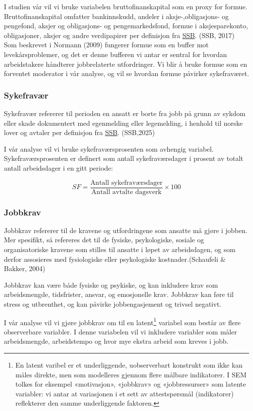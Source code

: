 \documentclass[
  12pt,
  a4paper,
  DIV=11,
  numbers=noendperiod]{scrartcl}
\begin{document}
I studien vår vil vi bruke variabelen bruttofinanskapital som en proxy
for formue. Bruttofinanskapital omfatter bankinnskudd, andeler i
aksje-,obligasjons- og pengefond, aksjer og obligasjons- og
pengemarkedsfond, formue i aksjesparekonto, obligasjoner, aksjer og
andre verdipapirer per definisjon fra
\href{https://www.ssb.no/a/metadata/conceptvariable/vardok/3449/nb}{SSB}.
(SSB, 2017) Som beskrevet i Normann (2009) fungerer formue som en buffer
mot levekårsproblemer, og det er denne bufferen vi antar er sentral for
hvordan arbeidstakere håndterer jobbrelaterte utfordringer. Vi blir å
bruke formue som en forventet moderator i vår analyse, og vil se hvordan
formue påvirker sykefraværet.

\subsubsection{Sykefravær}\label{sykefravuxe6r}

Sykefravær refererer til perioden en ansatt er borte fra jobb på grunn
av sykdom eller skade dokumentert med egenmelding eller legemelding, i
henhold til norske lover og avtaler per definisjon fra
\href{https://www.ssb.no/arbeid-og-lonn/arbeidsmiljo-sykefravaer-og-arbeidskonflikter/statistikk/sykefravaer}{SSB}.
(SSB,2025)

I vår analyse vil vi bruke sykefraværsprosenten som avhengig variabel.
Sykefraværsprosenten er definert som antall sykefraværsdager i prosent
av totalt antall arbeidsdager i en gitt periode:

\[
SF = \frac{ \text{Antall sykefraværsdager}}{\text{Antall avtalte dagsverk}}  \times 100
\]

\subsubsection{Jobbkrav}\label{jobbkrav}

Jobbkrav refererer til de kravene og utfordringene som ansatte må gjøre
i jobben. Mer spesifikt, så refereres det til de fysiske, psykologiske,
sosiale og organisatoriske kravene som stilles til ansatte i løpet av
arbeidsdagen, og som derfor assosieres med fysiologiske eller
psykologiske kostnader.(Schaufeli \& Bakker, 2004)

Jobbkrav kan være både fysiske og psykiske, og kan inkludere krav som
arbeidsmengde, tidsfrister, ansvar, og emosjonelle krav. Jobbkrav kan
føre til stress og utbrenthet, og kan påvirke jobbengasjement og trivsel
negativt.

I vår analyse vil vi gjøre jobbkrav om til en latent\footnote{En latent
  varibel er et underliggende, uobserverbart konstrukt som ikke kan
  måles direkte, men som modelleres gjennom flere målbare indikatorer. I
  SEM tolkes for eksempel «motivasjon», «jobbkrav» og «jobbressurser»
  som latente variabler: vi antar at variasjonen i et sett av
  attestspørsmål (indikatorer) reflekterer den samme underliggende
  faktoren.} variabel som består av flere observerbare variabler. I
denne variabelen vil vi inkludere variabler som måler arbeidsmengde,
arbeidstempo og hvor mye ekstra arbeid som kreves i jobb.
\end{document}
